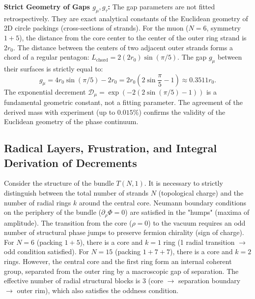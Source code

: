 \documentclass[11pt,a4paper]{article}
\begin{document}
\textbf{Strict Geometry of Gaps $g_\mu, g_\tau$:}
The gap parameters are not fitted retrospectively. They are exact analytical constants of the Euclidean geometry of 2D circle packings (cross-sections of strands).
For the muon ($N=6$, symmetry $1+5$), the distance from the core center to the center of the outer ring strand is $2r_0$. The distance between the centers of two adjacent outer strands forms a chord of a regular pentagon: $L_{\text{chord}} = 2 (2r_0) \sin(\pi/5)$. The gap $g_\mu$ between their surfaces is strictly equal to:
\begin{equation}
g_\mu = 4r_0 \sin(\pi/5) - 2r_0 = 2r_0 \left( 2\sin\frac{\pi}{5} - 1 \right) \approx 0.3511 r_0.
\end{equation}
The exponential decrement $\mathcal{D}_\mu = \exp(-2(2\sin(\pi/5)-1))$ is a fundamental geometric constant, not a fitting parameter. The agreement of the derived mass with experiment (up to $0.015\%$) confirms the validity of the Euclidean geometry of the phase continuum.

\subsection{Radical Layers, Frustration, and Integral Derivation of Decrements}
Consider the structure of the bundle $T(N,1)$. It is necessary to strictly distinguish between the total number of strands $N$ (topological charge) and the number of radial rings $k$ around the central core.
Neumann boundary conditions on the periphery of the bundle ($\partial_\rho \Phi = 0$) are satisfied in the "humps" (maxima of amplitude). The transition from the core ($\rho=0$) to the vacuum requires an odd number of structural phase jumps to preserve fermion chirality (sign of charge).
For $N=6$ (packing $1+5$), there is a core and $k=1$ ring (1 radial transition $\to$ odd condition satisfied).
For $N=15$ (packing $1+7+7$), there is a core and $k=2$ rings. However, the central core and the first ring form an internal coherent group, separated from the outer ring by a macroscopic gap of separation. The effective number of radial structural blocks is 3 (core $\to$ separation boundary $\to$ outer rim), which also satisfies the oddness condition.
\end{document}
